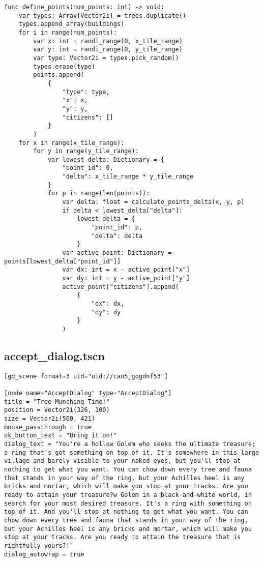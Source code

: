 \begin{lstlisting}
func define_points(num_points: int) -> void:
	var types: Array[Vector2i] = trees.duplicate()
	types.append_array(buildings)
	for i in range(num_points):
		var x: int = randi_range(0, x_tile_range)
		var y: int = randi_range(0, y_tile_range)
		var type: Vector2i = types.pick_random()
		types.erase(type)
		points.append(
			{
				"type": type,
				"x": x,
				"y": y,
				"citizens": []
			}
		)
	for x in range(x_tile_range):
		for y in range(y_tile_range):
			var lowest_delta: Dictionary = {
				"point_id": 0,
				"delta": x_tile_range * y_tile_range
			}
			for p in range(len(points)):
				var delta: float = calculate_points_delta(x, y, p)
				if delta < lowest_delta["delta"]:
					lowest_delta = {
						"point_id": p,
						"delta": delta
					}
				var active_point: Dictionary = points[lowest_delta["point_id"]]
				var dx: int = x - active_point["x"]
				var dy: int = y - active_point["y"]
				active_point["citizens"].append(
					{
						"dx": dx,
						"dy": dy
					}
				)
\end{lstlisting}

\subsection{accept\_dialog.tscn}

\begin{lstlisting}
[gd_scene format=3 uid="uid://cau5jgogdnf53"]

[node name="AcceptDialog" type="AcceptDialog"]
title = "Tree-Munching Time!"
position = Vector2i(326, 100)
size = Vector2i(500, 421)
mouse_passthrough = true
ok_button_text = "Bring it on!"
dialog_text = "You're a hollow Golem who seeks the ultimate treasure; a ring that's got something on top of it. It's somewhere in this large village and barely visible to your naked eyes, but you'll stop at nothing to get what you want. You can chow down every tree and fauna that stands in your way of the ring, but your Achilles heel is any bricks and mortar, which will make you stop at your tracks. Are you ready to attain your treasure?w Golem in a black-and-white world, in search for your most desired treasure. It's a ring with something on top of it. And you'll stop at nothing to get what you want. You can chow down every tree and fauna that stands in your way of the ring, but your Achilles heel is any bricks and mortar, which will make you stop at your tracks. Are you ready to attain the treasure that is rightfully yours?!"
dialog_autowrap = true
\end{lstlisting}

